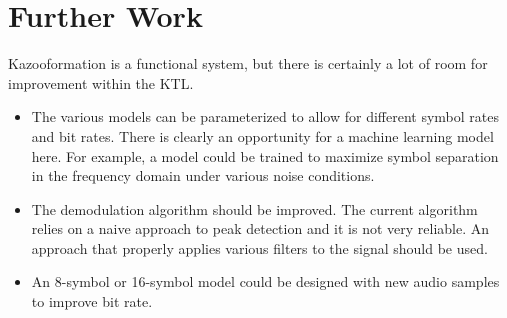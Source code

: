 \documentclass[]{article}
\begin{document}
\section{Further Work}


Kazooformation is a functional system, but there is certainly a lot of room for improvement within the KTL.

\begin{itemize}
  \item The various models can be parameterized to allow for different symbol rates and bit rates. There is clearly an opportunity for a machine learning model here. For example, a model could be trained to maximize symbol separation in the frequency domain under various noise conditions.

  \item The demodulation algorithm should be improved. The current algorithm relies on a naive approach to peak detection and it is not very reliable. An approach that properly applies various filters to the signal should be used.

  \item An 8-symbol or 16-symbol model could be designed with new audio samples to improve bit rate.
\end{itemize}







\end{document}
